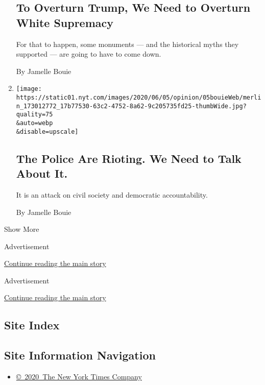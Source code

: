 \begin{enumerate}
{  \subsection{To Overturn Trump, We Need to Overturn White
  Supremacy}\label{to-overturn-trump-we-need-to-overturn-white-supremacy}}

  For that to happen, some monuments --- and the historical myths they
  supported --- are going to have to come down.

  By Jamelle Bouie
\item
  \href{/2020/06/05/opinion/sunday/police-riots.html}{}

  \texttt{[image: https://static01.nyt.com/images/2020/06/05/opinion/05bouieWeb/merlin\_173012772\_17b77530-63c2-4752-8a62-9c205735fd25-thumbWide.jpg?quality=75\\\&auto=webp\\\&disable=upscale]}

  \hypertarget{the-police-are-rioting-we-need-to-talk-about-it}{%
  \subsection{The Police Are Rioting. We Need to Talk About
  It.}\label{the-police-are-rioting-we-need-to-talk-about-it}}

  It is an attack on civil society and democratic accountability.

  By Jamelle Bouie
\end{enumerate}

Show More

Advertisement

\protect\hyperlink{after-mid1}{Continue reading the main story}

Advertisement

\protect\hyperlink{after-mktg}{Continue reading the main story}

\hypertarget{site-index}{%
\subsection{Site Index}\label{site-index}}

\hypertarget{site-information-navigation}{%
\subsection{Site Information
Navigation}\label{site-information-navigation}}

\begin{itemize}
\tightlist
\item
  \href{https://help.nytimes.com/hc/en-us/articles/115014792127-Copyright-notice}{©~2020~The
  New York Times Company}
\end{itemize}

